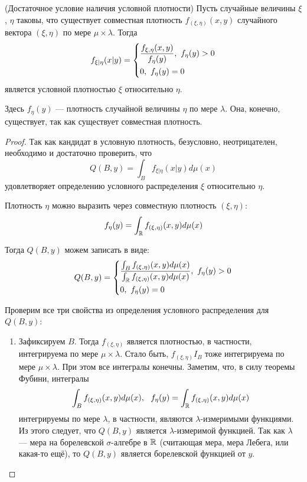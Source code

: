 \begin{theorem} (Достаточное условие наличия условной плотности)
    Пусть случайные величины $\xi$, $\eta$ таковы, что существует совместная плотность $f_{(\xi, \eta)}(x, y)$ случайного вектора $(\xi, \eta)$ по мере $\mu \times \lambda$. Тогда
    \[
        f_{\xi | \eta}(x | y) = \left\{\begin{aligned}
            & \frac{f_{\xi, \eta}(x, y)}{f_\eta(y)},\ f_\eta(y) > 0
            \\
            & 0,\ f_\eta(y) = 0
        \end{aligned}\right.
    \]
    является условной плотностью $\xi$ относительно $\eta$.

    Здесь $f_\eta(y)$ --- плотность случайной величины $\eta$ по мере $\lambda$. Она, конечно, существует, так как существует совместная плотность.
\end{theorem}

\begin{proof}
    Так как кандидат в условную плотность, безусловно, неотрицателен, необходимо и достаточно проверить, что
    \[
        Q(B, y) = \int_B f_{\xi | \eta}(x | y) d\mu(x)
    \]
    удовлетворяет определению условного распределения $\xi$ относительно $\eta$.

    Плотность $\eta$ можно выразить через совместную плотность $(\xi, \eta)$:
    \[
        f_\eta(y) = \int_{\mathbb{R}} f_{(\xi, \eta)}(x, y) d\mu(x)
    \]
    
    Тогда $Q(B, y)$ можем записать в виде:
    \[
        Q(B, y) = \left\{\begin{aligned}
            & \frac{\int_B f_{(\xi, \eta)}(x, y) d\mu(x)}{\int_{\mathbb{R}} f_{(\xi, \eta)}(x, y) d\mu(x)},\  f_\eta(y) > 0
            \\
            & 0,\ f_\eta(y) = 0
        \end{aligned}\right.
    \]

    Проверим все три свойства из определения условного распределения для $Q(B, y)$:
    \begin{enumerate}
        \item Зафиксируем $B$. Тогда $f_{(\xi, \eta)}$ является плотностью, в частности, интегрируема по мере $\mu \times \lambda$. Стало быть, $f_{(\xi, \eta)} I_B$ тоже интегрируема по мере $\mu \times \lambda$. При этом все интегралы конечны. Заметим, что, в силу теоремы Фубини, интегралы
        \[
            \int_B f_{(\xi, \eta)}(x, y) d\mu(x),\ \ f_\eta(y) = \int_{\mathbb{R}} f_{(\xi, \eta)}(x, y) d\mu(x)
        \]
        интегрируемы по мере $\lambda$, в частности, являются $\lambda$-измеримыми функциями. Из этого следует, что $Q(B, y)$ является $\lambda$-измеримой функцией. Так как $\lambda$ --- мера на борелевской $\sigma$-алгебре в $\mathbb{R}$ (считающая мера, мера Лебега, или какая-то ещё), то $Q(B, y)$ является борелевской функцией от $y$.


\end{enumerate}
\end{proof}
